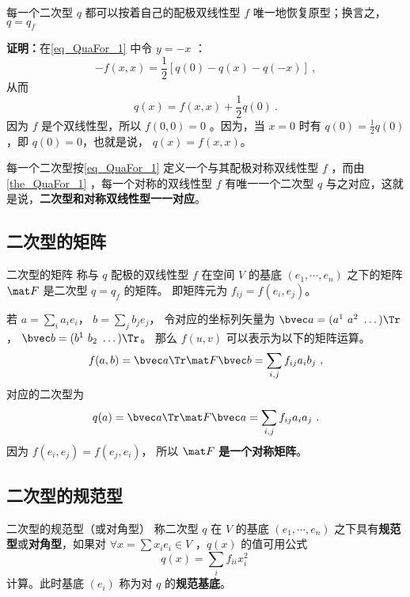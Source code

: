\begin{theorem}{}\label{the_QuaFor_1}
每一个二次型 $q$ 都可以按着自己的配极双线性型 $f$ 唯一地恢复原型；换言之， $q=q_f$
\end{theorem}
\textbf{证明：}在\autoref{eq_QuaFor_1} 中令 $y=-x$ ：
\begin{equation}
-f(x,x)=\frac{1}{2}[q(0)-q(x)-q(-x)]~,
\end{equation}
从而
\begin{equation}
q(x)=f(x,x)+\frac{1}{2}q(0)~.
\end{equation}
因为 $f$ 是个双线性型，所以 $f(0,0)=0$ 。因为，当 $x=0$ 时有 $q(0)=\frac{1}{2}q(0)$ ，即 $q(0)=0$，也就是说， $q(x)=f(x,x)$。

每一个二次型按\autoref{eq_QuaFor_1} 定义一个与其配极对称双线性型 $f$ ，而由\autoref{the_QuaFor_1} ，每一个对称的双线性型 $f$ 有唯一一个二次型 $q$ 与之对应，这就是说，\textbf{二次型和对称双线性型一一对应}。

\subsection{二次型的矩阵}
\begin{definition}{二次型的矩阵}
称与 $q$ 配极的双线性型 $f$ 在空间 $V$ 的基底 $(e_1,\cdots,e_n)$ 之下的矩阵 $\mat F$ 是二次型 $q=q_f$ 的矩阵。 即矩阵元为 $f_{ij} = f(e_i, e_j)$。
\end{definition}

若 $a = \sum_i a_i e_i$， $b = \sum_j b_j e_j$， 令对应的坐标列矢量为 $\bvec a = (a^1\ a^2\ \dots)\Tr$， $\bvec b = (b^1\ b_2\ \dots)\Tr$。 那么 $f(u, v)$ 可以表示为以下的矩阵运算。
\begin{equation}
f(a, b) = \bvec a\Tr \mat F \bvec b = \sum_{i,j} f_{ij}a_i b_j~,
\end{equation}
对应的二次型为
\begin{equation}
q(a) = \bvec a\Tr \mat F \bvec a = \sum_{i,j} f_{ij}a_i a_j~.
\end{equation}
因为 $f(e_i, e_j) = f(e_j, e_i)$， 所以 $\mat F$ \textbf{是一个对称矩阵}。

\subsection{二次型的规范型}
\begin{definition}{二次型的规范型（或对角型）}\label{def_QuaFor_1}
称二次型 $q$ 在 $V$ 的基底 $(e_1,\cdots,e_n)$ 之下具有\textbf{规范型}或\textbf{对角型}，如果对 $\forall x=\sum x_i e_i\in V$ ，$q(x)$ 的值可用公式
\begin{equation}
q(x)=\sum_{i}f_{ii}x_i^2~
\end{equation}
计算。此时基底 $(e_i)$ 称为对 $q$ 的\textbf{规范基底}。
\end{definition}

